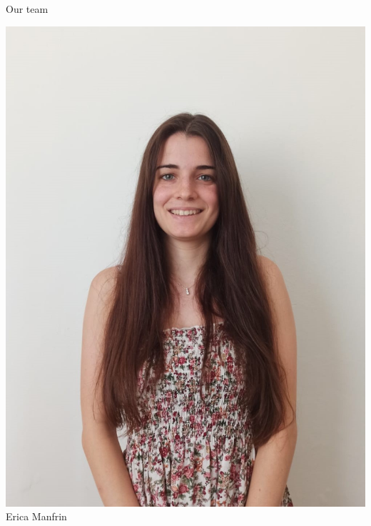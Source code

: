 \documentclass{beamer}
\begin{document}
\begin{frame}{Our team}
\begin{minipage}{0.24\textwidth}
\begin{center}
		\includegraphics[width=\columnwidth]{erikataglio.jpeg}
		Erica Manfrin
	\end{center}
\end{minipage}
\hfill
\begin{minipage}{0.24\textwidth}
	\begin{center}%

\end{center}
\end{minipage}
\end{frame}
\end{document}
